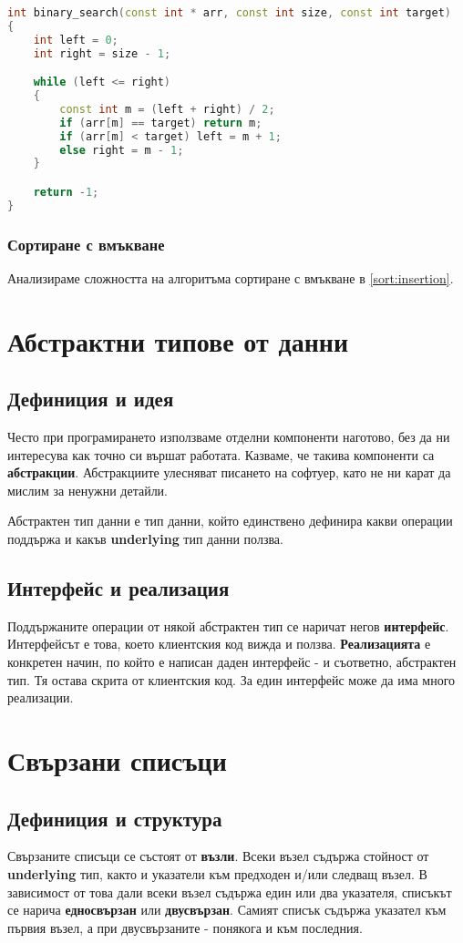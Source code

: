 \documentclass[fleqn,12pt]{article}
\begin{document}
\begin{lstlisting}[language=C++, caption=Двоично търсене]
int binary_search(const int * arr, const int size, const int target)
{
    int left = 0;
    int right = size - 1;

    while (left <= right)
    {
        const int m = (left + right) / 2;
        if (arr[m] == target) return m;
        if (arr[m] < target) left = m + 1;
        else right = m - 1;
    }

    return -1;
}
\end{lstlisting}
    
\subsubsection{Сортиране с вмъкване}
Анализираме сложността на алгоритъма сортиране с вмъкване в \ref{sort:insertion}.

\section{Абстрактни типове от данни}
\subsection{Дефиниция и идея}
Често при програмирането използваме отделни компоненти наготово, без да ни интересува как точно си вършат работата.
Казваме, че такива компоненти са \textbf{абстракции}. Абстракциите улесняват писането на софтуер, като не ни карат 
да мислим за ненужни детайли.

Абстрактен тип данни е тип данни, който единствено дефинира какви операции поддържа и какъв \textbf{underlying} тип данни ползва.

\subsection{Интерфейс и реализация}
Поддържаните операции от някой абстрактен тип се наричат негов \textbf{интерфейс}. Интерфейсът е това, което клиентския код 
вижда и ползва. \textbf{Реализацията} е конкретен начин, по който е написан даден интерфейс - и съответно, абстрактен тип.
Тя остава скрита от клиентския код. За един интерфейс може да има много реализации.

\section{Свързани списъци}
\subsection{Дефиниция и структура}
Свързаните списъци се състоят от \textbf{възли}. Всеки възел съдържа стойност от \textbf{underlying} тип, както 
и указатели към предходен и/или следващ възел. В зависимост от това дали всеки възел съдържа един или два указателя,
списъкът се нарича \textbf{едносвързан} или \textbf{двусвързан}. Самият списък съдържа указател към първия възел, 
а при двусвързаните - понякога и към последния.
\end{document}
